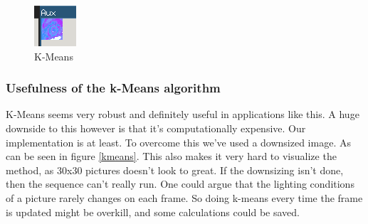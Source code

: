 \begin{figure}[htbp]
\centering
\includegraphics{pics/kmeans.png}
\caption{K-Means}
\end{figure}

\subsubsection{Usefulness of the k-Means algorithm}

K-Means seems very robust and definitely useful in applications like
this. A huge downside to this however is that it's computationally
expensive. Our implementation is at least. To overcome this we've used a
downsized image. As can be seen in figure \ref{kmeans}. This also makes
it very hard to visualize the method, as 30x30 pictures doesn't look to
great. If the downsizing isn't done, then the sequence can't really run.
One could argue that the lighting conditions of a picture rarely changes
on each frame. So doing k-means every time the frame is updated might be
overkill, and some calculations could be saved.
